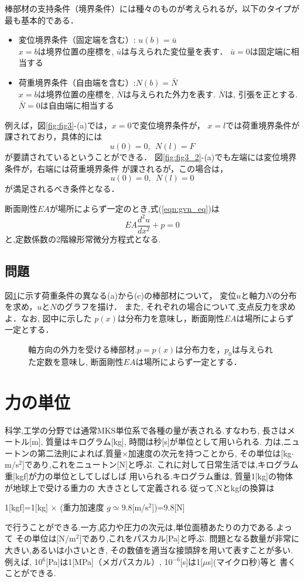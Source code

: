 \documentclass[11pt,a4j]{mybook2}
\begin{document}
棒部材の支持条件（境界条件）には種々のものが考えられるが，以下のタイプが最も基本的である．
\begin{itemize}
\item
変位境界条件（固定端を含む）: $u(b)=\bar{u}$\\
	$x=b$は境界位置の座標を, $\bar u$は与えられた変位量を表す．
	$\bar u=0$は固定端に相当する
\item
荷重境界条件（自由端を含む）:$N(b)=\bar{N}$\\
	 $x=b$は境界位置の座標を, $\bar N$は与えられた外力を表す.
	$\bar{N}$は, 引張を正とする. $\bar N=0$は自由端に相当する
\end{itemize}
例えば，図\ref{fig:fig3}-(a)では，$x=0$で変位境界条件が，
$x=l$では荷重境界条件が課されており，具体的には
\[
	u(0)=0, \ \ N(l)=F
\]
が要請されているということができる．
図\ref{fig:fig3_2}-(a)でも左端には変位境界条件が，右端には荷重境界条件
が課されるが，この場合は，
\[
	u(0)=0, \ \ N(l)=0
\]
が満足されるべき条件となる．

断面剛性$EA$が場所によらず一定のとき,式(\ref{eqn:gvn_eq})は
\begin{equation}
	EA\frac{d^2u}{dx^2}+p=0
	\label{eqn:gvn_eq2}
\end{equation}
と,定数係数の2階線形常微分方程式となる.
\subsection{問題}
図\ref{fig:fig4}に示す荷重条件の異なる(a)から(c)の棒部材について，
変位$u$と軸力$N$の分布を求め，$u$と$N$のグラフを描け．
また, それぞれの場合について,支点反力を求めよ．なお, 図中に示した
$p(x)$は分布力を意味し，断面剛性$EA$は場所によらず一定とする．
\begin{figure}[h]
	\begin{center}
	\end{center}
	\caption{軸方向の外力を受ける棒部材.$p=p(x)$は分布力を，$p_0$は与えられた定数を意味し, 
	断面剛性$EA$は場所によらず一定とする．} 
	\label{fig:fig4}
\end{figure}
\section{力の単位}
科学,工学の分野では通常MKS単位系で各種の量が表される.すなわち, 
長さはメートル[m], 質量はキログラム[kg], 時間は秒[s]が単位として用いられる.
力は,ニュートンの第二法則によれば,質量×加速度の次元を持つことから, 
その単位は[kg$\cdot$m/s$^2$]であり,これをニュートン[N]と呼ぶ.
これに対して日常生活では,キログラム重[kgf]が力の単位としてしばしば
用いられる.キログラム重は, 質量1[kg]の物体が地球上で受ける重力の
大きさとして定義される.従って,Nとkgfの換算は
\begin{center}
	1[kgf]=1[kg] $\times$ (重力加速度  $g\simeq$9.8[m/s$^2$])=9.8[N]
\end{center}
で行うことができる.一方,応力や圧力の次元は,単位面積あたりの力である.よって
その単位は[N/m$^2$]であり,これをパスカル[Pa]と呼ぶ.
問題となる数量が非常に大きい,あるいは小さいとき,
その数値を適当な接頭辞を用いて表すことが多い.例えば,
10$^6$[Pa]は1[MPa]（メガパスカル）, 10$^{-6}$[s]は1[$\mu$s](マイクロ秒)等と
書くことができる.
\clearpage
\end{document}
